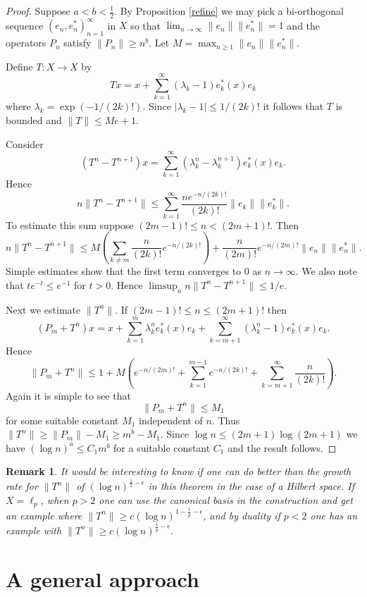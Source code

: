 \documentclass[12pt]{amsart}
\newtheorem{rem}[thm]{Remark}
\begin{document}
\begin{proof}  Suppose $a<b<\frac12.$   By Proposition \ref{refine} we may pick a bi-orthogonal
sequence $(e_n,e_n^*)_{n=1}^{\infty}$ in $X$ so that
$\lim_{n\to\infty}\|e_n\|\|e_n^*\|=1$ and the operators $P_n$
satisfy $\|P_n\|\ge n^b.$  Let $M=\max_{n\ge 1}\|e_n\|\|e_n^*\|.$


  Define $T:X\to X$ by
$$Tx = x+\sum_{k=1}^{\infty}(\lambda_k-1)e_k^*(x)e_k$$
where $\lambda_k=\exp(-1/(2k)!)$.  Since $|\lambda_k-1|\le
1/(2k)!$ it follows that $T$ is bounded and $\|T\|\le Me+1$.

Consider
$$(T^n-T^{n+1})x=
\sum_{k=1}^{\infty}(\lambda_k^n-\lambda_k^{n+1})e_k^*(x)e_k.$$
Hence
$$ n\|T^n-T^{n+1}\|\le \sum_{k=1}^{\infty}\frac{ ne^{-n/(2k)!}}{(2k)!}\|e_k\|\|e_k^*\|.$$
To estimate this sum suppose $(2m-1)!\le n<(2m+1)!$.  Then
$$ n\|T^n-T^{n+1}\| \le
M\left(\sum_{k\neq m} \frac{n}{(2k)!}e^{-n/(2k)!}\right) +
\frac{n}{(2m)!}e^{-n/(2m)!}\|e_n\|\|e_n^*\|.$$ Simple estimates show
that the first term converges to $0$ as $n \to \infty$.  We also
note that $te^{-t}\le e^{-1}$ for $t>0$. Hence $\limsup_n
n\|T^n-T^{n+1}\| \le 1/e$.

Next we estimate $\|T^n\|.$  If $(2m-1)!\le n\le (2m+1)!$  then
$$ (P_m+T^n)x= x+\sum_{k=1}^{m}\lambda_k^ne_k^*(x)e_k+
\sum_{k=m+1}^{\infty}(\lambda_k^n-1)e_k^*(x)e_k.$$ Hence
$$ \|P_m+T^n\|\le 1+
M\left(e^{-n/(2m)!}+\sum_{k=1}^{m-1}e^{-n/(2k)!}+\sum_{k=m+1}^{\infty}
\frac{n}{(2k)!}\right).$$  Again it is simple to see that
$$ \|P_m+T^n\|\le M_1$$ for some suitable constant $M_1$
independent of $n.$  Thus $\|T^n\|\ge \|P_m\|-M_1 \ge m^{b}-M_1.$
Since $\log n \le (2m+1)\log(2m+1)$ we have $(\log n)^a \le
C_1m^b$ for a suitable constant $C_1$ and the result follows.
\end{proof}

\begin{rem}  {\rm It would be interesting to know if one can do
better than the growth rate for $\|T^n\|$ of $(\log
n)^{\frac12-\epsilon}$ in this theorem in the case of a Hilbert
space.  If $X=\ell_p$, when $p>2$ one can use the canonical basis
in the construction and get an example where $\|T^n\|\ge c(\log
n)^{1-\frac1p-\epsilon}$, and by duality if $p<2$ one has an
example with $\|T^n\|\ge c(\log n)^{\frac1p-\epsilon}.$}
\end{rem}

\section{A general approach}
\label{general}
\end{document}

